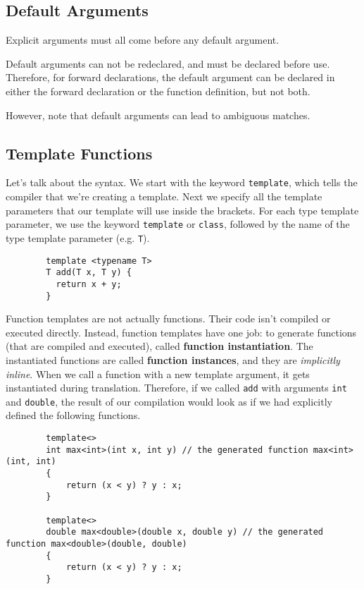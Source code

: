 \documentclass{article}
\begin{document}
  \subsection{Default Arguments} 

    Explicit arguments must all come before any default argument. 

    Default arguments can not be redeclared, and must be declared before use. Therefore, for forward declarations, the default argument can be declared in either the forward declaration or the function definition, but not both.   

    However, note that default arguments can lead to ambiguous matches. 

  \subsection{Template Functions}

    \begin{definition}
      Let's talk about the syntax. We start with the keyword \texttt{template}, which tells the compiler that we're creating a template. Next we specify all the template parameters that our template will use inside the brackets. For each type template parameter, we use the keyword \texttt{template} or \texttt{class}, followed by the name of the type template parameter (e.g. \texttt{T}). 
      \begin{lstlisting}
        template <typename T> 
        T add(T x, T y) {
          return x + y; 
        } 
      \end{lstlisting}
      Function templates are not actually functions. Their code isn't compiled or executed directly. Instead, function templates have one job: to generate functions (that are compiled and executed), called \textbf{function instantiation}. The instantiated functions are called \textbf{function instances}, and they are \textit{implicitly inline}. When we call a function with a new template argument, it gets instantiated during translation. Therefore, if we called \texttt{add} with arguments \texttt{int} and \texttt{double}, the result of our compilation would look as if we had explicitly defined the following functions. 
      \begin{lstlisting}
        template<>
        int max<int>(int x, int y) // the generated function max<int>(int, int)
        {
            return (x < y) ? y : x;
        }

        template<>
        double max<double>(double x, double y) // the generated function max<double>(double, double)
        {
            return (x < y) ? y : x;
        }
      \end{lstlisting}
    \end{definition}
\end{document}
